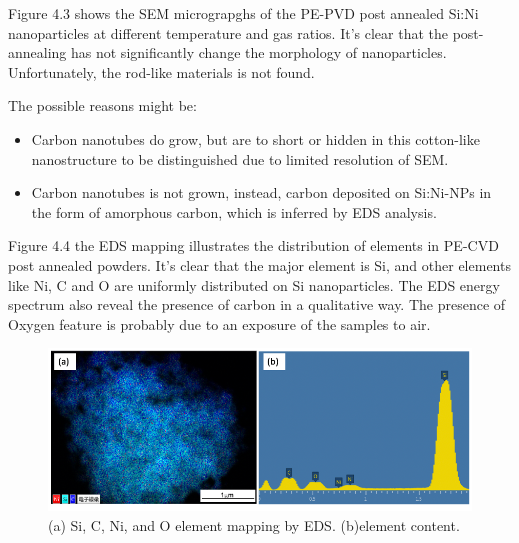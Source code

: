 Figure 4.3 shows the SEM micrograpghs of the PE-PVD post annealed Si:Ni nanoparticles at different temperature and gas ratios. It’s clear that the post-annealing has not significantly change the morphology of nanoparticles. Unfortunately, the rod-like materials is not found. 

The possible reasons might be: 
\begin{itemize}
  \item Carbon nanotubes do grow, but are to short or hidden in this cotton-like nanostructure to be distinguished due to limited resolution of SEM.
  \item Carbon nanotubes is not grown, instead, carbon deposited on Si:Ni-NPs in the form of amorphous carbon, which is inferred by EDS analysis. 
\end{itemize}
\newpage
Figure 4.4 the EDS mapping illustrates the distribution of elements in PE-CVD post annealed powders. It’s clear that the major element is Si, and other elements like Ni, C and O are uniformly distributed on Si nanoparticles. The EDS energy spectrum also reveal the presence of carbon in a qualitative way. The presence of Oxygen feature is probably due to an exposure of the samples to air.
\begin{figure}[H]
\centering
\includegraphics[width=12cm]{src/fig/fig45.png}
\caption{(a) Si, C, Ni, and O element mapping by EDS. (b)element content.}
\end{figure}
\newpage
